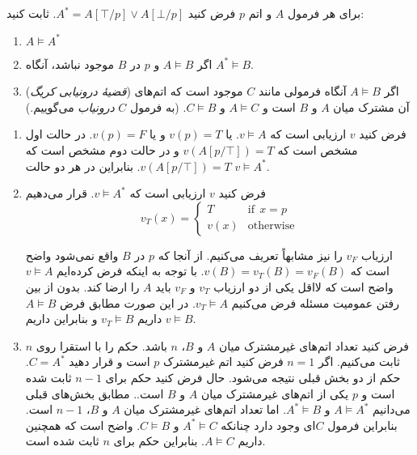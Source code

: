 برای هر فرمول $A$ و اتم $p$ فرض کنید
$A^*=A[\top/p]\vee A[\bot/p]$.
ثابت کنید:
\begin{enumerate}
\item
$A\models A^*$
\item
اگر
$A\models B$
و $p$ در $B$ موجود نباشد، آنگاه
$A^*\models B$.
\item
(\emph{قضیهٔ درونیابی کریگ})
اگر
$A\models B$
آنگاه فرمولی مانند $C$ موجود است که اتم‌های آن مشترک میان $A$ و $B$ است و $A\models C$ و $C\models B$.
(به فرمول $C$ \emph{درونیاب} می‌گوییم.)
\end{enumerate}\quad
\begin{ans}
  \begin{enumerate}
  \item
  فرض کنید $v$ ارزیابی است که $v\models A$. یا $v(p)=T$ و یا $v(p)=F$. در حالت اول مشخص است که
  $v(A[p/\top])=T$
  و در حالت دوم مشخص است که
  $v(A[p/\top])=T$.
  بنابراین در هر دو حالت
  $v\models A^*$.

  \item
  فرض کنید $v$ ارزیابی است که $v\models A^*$. قرار می‌دهیم
  $$
  v_T(x)=
  \begin{cases}
  T & \text{if}~~x=p\\
  v(x) & \text{otherwise}
  \end{cases}
  $$

  ارزیاب $v_F$ را نیز مشابهاً تعریف می‌کنیم. از آنجا که $p$ در $B$ واقع نمی‌شود واضح است که $v(B)=v_T(B)=v_F(B)$. با توجه به اینکه فرض کرده‌ایم $v\models A$ واضح است که لااقل یکی از دو ارزیاب $v_T$ و $v_F$ باید $A$ را ارضا کند. بدون از بین رفتن عمومیت مسئله فرض می‌کنیم $v_T\models A$. در این صورت مطابق فرض $A\models B$ داریم $v_T\models B$ و بنابراین داریم $v\models B$.

  \item
  فرض کنید تعداد اتم‌های غیرمشترک میان $A$ و $B$، $n$ باشد. حکم را با استقرا روی $n$ ثابت می‌کنیم. اگر $n=1$ فرض کنید اتم غیرمشترک $p$ است و قرار دهید $C=A^*$. حکم از دو بخش قبلی نتیجه می‌شود. حال فرض کنید حکم برای $n-1$ ثابت شده است و $p$ یکی از اتم‌های غیرمشترک میان $A$ و $B$ است.. مطابق بخش‌های قبلی می‌دانیم $A\models A^*$ و $A^*\models B$. اما تعداد اتم‌های غیرمشترک میان $A$ و $B$، $n-1$ است. بنابراین فرمول $C$ای وجود دارد چنانکه $A^*\models C$ و $C\models B$. واضح است که همچنین داریم $A\models C$. بنابراین حکم برای $n$ ثابت شده است.
  \end{enumerate}
\end{ans}